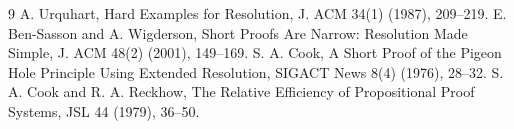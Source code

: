 \documentclass[11pt]{article}
\begin{document}
\begin{thebibliography}{9}
 A. Urquhart, Hard Examples for Resolution, J. ACM 34(1) (1987), 209--219.
 E. Ben-Sasson and A. Wigderson, Short Proofs Are Narrow: Resolution Made Simple, J. ACM 48(2) (2001), 149--169.
 S. A. Cook, A Short Proof of the Pigeon Hole Principle Using Extended Resolution, SIGACT News 8(4) (1976), 28--32.
 S. A. Cook and R. A. Reckhow, The Relative Efficiency of Propositional Proof Systems, JSL 44 (1979), 36--50.
\end{thebibliography}
\end{document}
